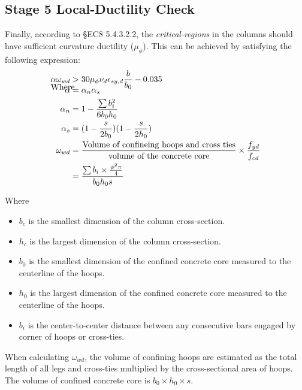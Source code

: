 \renewcommand{\g}[1]{\MyGet{cl.#1}}
\subsection{Stage 5 Local-Ductility Check}
Finally, according to \S EC8 5.4.3.2.2, the \emph{critical-regions} in the
columns should have sufficient curvature ductility ($\mu_{\phi}$). This can be
achieved by satisfying the following expression:
\begin{align*}
  \alpha \omega_{wd} &> 30 \mu_{\phi} \nu_{d} \epsilon_{sy,d} \frac{b}{b_{0}} - 0.035\\
   \\[-1cm]               %
  \intertext{Where}
  \\[-1cm]               %
  \alpha &= \alpha_n \alpha_{s} \\
  \alpha_n &= 1 - \frac{\sum b_i^2}{6b_0h_0} \\
  \alpha_s &= (1- \frac{s}{2b_0})(1 - \frac{s}{2h_0})\\
  \omega_{wd} &= \frac{\mbox{Volume of confineing hoops and cross ties}}
                {\mbox{volume of the concrete core}} \times \frac{f_{yd}}{f_{cd}}\\
  &= \frac{\sum b_i \times \frac{\phi^2\pi}{4}}{b_0h_0s}
\end{align*}

Where
\begin{itemize}
\item $b_c$ is the smallest dimension of the column cross-section.
\item $h_c$ is the largest dimension of the column cross-section.
\item $b_0$ is the smallest dimension of the confined concrete core measured to
  the centerline of the hoops.
\item $h_0$ is the largest dimension of the confined concrete core measured to
  the centerline of the hoops.
\item $b_i$ is the center-to-center distance between any consecutive bars
  engaged by corner of hoops or cross-ties.
\end{itemize}
When calculating $\omega_{wd}$, the volume of confining hoops are estimated as
the total length of all legs and cross-ties multiplied by the cross-sectional
area of hoops. The volume of confined concrete core is $b_0 \times h_0 \times
s$.

